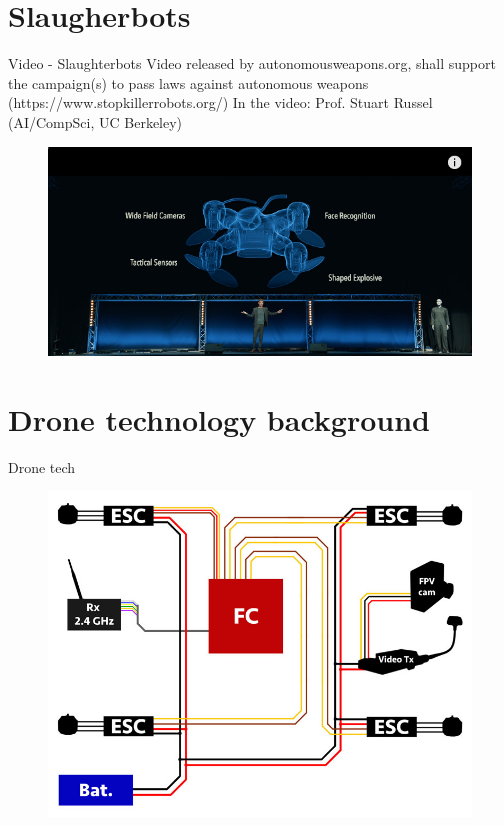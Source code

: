 \documentclass[aspectratio=169]{beamer}
\begin{document}
\section{Slaugherbots}
	\begin{frame}{Video - Slaughterbots}
		Video released by autonomousweapons.org, shall support the campaign(s) to pass laws against autonomous weapons (https://www.stopkillerrobots.org/)
		In the video: Prof. Stuart Russel (AI/CompSci, UC Berkeley)
		\begin{figure}
			\includegraphics[width=.8\linewidth]{images/slaughterbots.png}
		\end{figure}
	\end{frame}

\section{Drone technology background}
\begin{frame}{Drone tech}
	\begin{figure}
		\includegraphics[width=0.6\linewidth]{images/06-FPV-Overview_1.jpg}
	\end{figure}
	\color{gray}{http://fpvracing.ch/img/cms/infobereich/Bauanleitung/06-FPV-Overview\_1.jpg}
\end{frame}
\end{document}
